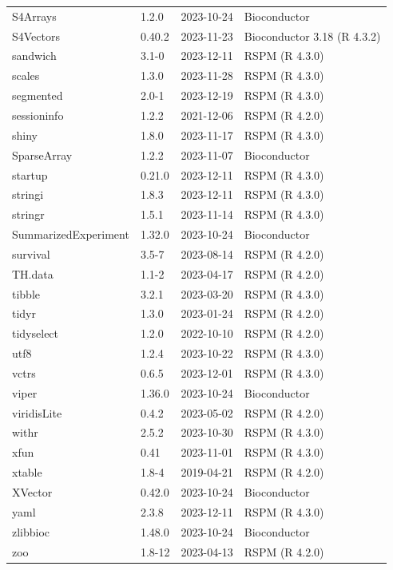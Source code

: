\begin{longtable}[t]{llll}
S4Arrays & 1.2.0 & 2023-10-24 & Bioconductor\\
\addlinespace
S4Vectors & 0.40.2 & 2023-11-23 & Bioconductor 3.18 (R 4.3.2)\\
sandwich & 3.1-0 & 2023-12-11 & RSPM (R 4.3.0)\\
scales & 1.3.0 & 2023-11-28 & RSPM (R 4.3.0)\\
segmented & 2.0-1 & 2023-12-19 & RSPM (R 4.3.0)\\
sessioninfo & 1.2.2 & 2021-12-06 & RSPM (R 4.2.0)\\
\addlinespace
shiny & 1.8.0 & 2023-11-17 & RSPM (R 4.3.0)\\
SparseArray & 1.2.2 & 2023-11-07 & Bioconductor\\
startup & 0.21.0 & 2023-12-11 & RSPM (R 4.3.0)\\
stringi & 1.8.3 & 2023-12-11 & RSPM (R 4.3.0)\\
stringr & 1.5.1 & 2023-11-14 & RSPM (R 4.3.0)\\
\addlinespace
SummarizedExperiment & 1.32.0 & 2023-10-24 & Bioconductor\\
survival & 3.5-7 & 2023-08-14 & RSPM (R 4.2.0)\\
TH.data & 1.1-2 & 2023-04-17 & RSPM (R 4.2.0)\\
tibble & 3.2.1 & 2023-03-20 & RSPM (R 4.3.0)\\
tidyr & 1.3.0 & 2023-01-24 & RSPM (R 4.2.0)\\
\addlinespace
tidyselect & 1.2.0 & 2022-10-10 & RSPM (R 4.2.0)\\
utf8 & 1.2.4 & 2023-10-22 & RSPM (R 4.3.0)\\
vctrs & 0.6.5 & 2023-12-01 & RSPM (R 4.3.0)\\
viper & 1.36.0 & 2023-10-24 & Bioconductor\\
viridisLite & 0.4.2 & 2023-05-02 & RSPM (R 4.2.0)\\
\addlinespace
withr & 2.5.2 & 2023-10-30 & RSPM (R 4.3.0)\\
xfun & 0.41 & 2023-11-01 & RSPM (R 4.3.0)\\
xtable & 1.8-4 & 2019-04-21 & RSPM (R 4.2.0)\\
XVector & 0.42.0 & 2023-10-24 & Bioconductor\\
yaml & 2.3.8 & 2023-12-11 & RSPM (R 4.3.0)\\
\addlinespace
zlibbioc & 1.48.0 & 2023-10-24 & Bioconductor\\
zoo & 1.8-12 & 2023-04-13 & RSPM (R 4.2.0)\\
\bottomrule
\end{longtable}

